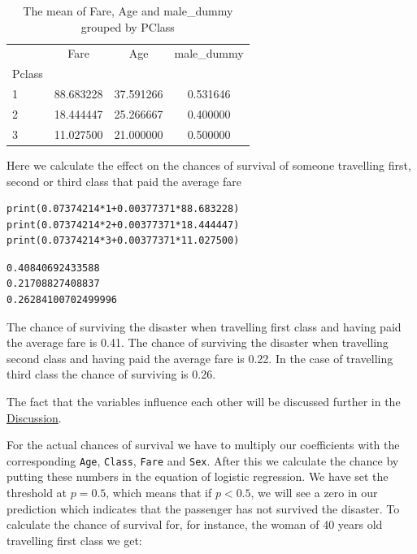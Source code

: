 \documentclass[11pt]{article}
\begin{document}
\begin{table}
\small
\begin{center}
\caption{\label{tab:tablegroupby}The mean of Fare, Age and male_dummy grouped by PClass}
\begin{tabular}{|l|c|c|c|}
\toprule
\hline
{} &       Fare &        Age &  male\_dummy \\
Pclass &            &            &             \\
\midrule
\hline
1      &  88.683228 &  37.591266 &    0.531646 \\
2      &  18.444447 &  25.266667 &    0.400000 \\
3      &  11.027500 &  21.000000 &    0.500000 \\
\bottomrule
\hline
\end{tabular}
\end{center}
\end{table}



Here we calculate the effect on the chances of survival of someone travelling first, second or third class that paid the average fare 
\begin{verbatim}
print(0.07374214*1+0.00377371*88.683228)
print(0.07374214*2+0.00377371*18.444447)
print(0.07374214*3+0.00377371*11.027500)
\end{verbatim}

\begin{verbatim}
0.40840692433588
0.21708827408837
0.26284100702499996

\end{verbatim}

The chance of surviving the disaster when travelling first class and having paid the average fare is 0.41. The chance of surviving the disaster when travelling second class and having paid the average fare is 0.22. In the case of travelling third class the chance of surviving is 0.26. 

The fact that the variables influence each other will be discussed further in the \hyperref[sec:discussion]{Discussion}. 

For the actual chances of survival we have to multiply our coefficients with the corresponding \texttt{Age}, \texttt{Class}, \texttt{Fare} and \texttt{Sex}. After this we calculate the chance by putting these numbers in the equation of logistic regression. We have set the threshold at \(p = 0.5\), which means that if \(p < 0.5\),  we will see a zero in our prediction which indicates that the passenger has not survived the disaster. To calculate the chance of survival for, for instance, the woman of 40 years old travelling first class we get: 
\end{document}
